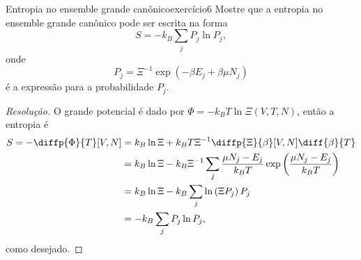 \begin{exercício}{Entropia no ensemble grande canônico}{exercício6}
    Mostre que a entropia no ensemble grande canônico pode ser escrita na forma
    \begin{equation*}
        S = - k_B\sum_j P_j \ln{P_j},
    \end{equation*}
    onde
    \begin{equation*}
        P_j = \Xi^{-1} \exp\left(-\beta E_j + \beta \mu N_j\right)
    \end{equation*}
    é a expressão para a probabilidade \(P_j\).
\end{exercício}
\begin{proof}[Resolução]
    O grande potencial é dado por \(\Phi = -k_B T \ln \Xi(V, T, N)\), então a entropia é
    \begin{align*}
        S = - \diffp{\Phi}{T}[V, N] &= k_B \ln \Xi + k_B T \Xi^{-1} \diffp{\Xi}{\beta}[V,N]\diff{\beta}{T}\\
                                    &= k_B \ln \Xi - k_B \Xi^{-1} \sum_{j} \frac{\mu N_j - E_j}{k_BT} \exp\left(\frac{\mu N_j - E_j}{k_B T}\right)\\
                                    &= k_B \ln \Xi - k_B \sum_j \ln\left(\Xi P_j\right) P_j\\
                                    &= -k_B \sum_j P_j \ln P_j,
    \end{align*}
    como desejado.
\end{proof}

